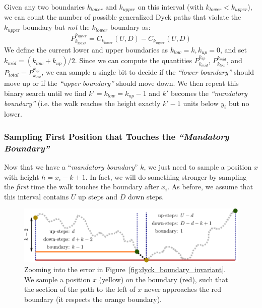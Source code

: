 Given any two boundaries $k_{lower}$ and $k_{upper}$ on this interval (with $k_{lower} < k_{upper}$),
we can count the number of possible generalized Dyck paths that violate the $k_{upper}$ boundary but \emph{not} the $k_{lower}$ boundary as:
\[
P_{k_{lower}}^{k_{upper}} = C_{k_{lower}}(U,D) - C_{k_{upper}}(U,D)
\]
We define the current lower and upper boundaries as $k_{low} = k, k_{up} = 0$, and set $k_{mid} = (k_{low} + k_{up})/2$.
Since we can compute the quantities $P_{k_{mid}}^{k_{up}}$, $P_{k_{low}}^{k_{mid}}$, and $P_{total} = P_{k_{low}}^{k_{up}}$,
we can sample a single bit to decide if the \emph{``lower boundary''} should move up or if the \emph{``upper boundary''} should move down.
We then repeat this binary search until we find $k' = k_{low} = k_{up}-1$ and $k'$ becomes the \emph{``mandatory boundary''}
(i.e. the walk reaches the height exactly $k'-1$ units below $y_i$ but no lower.



\subsubsection{Sampling First Position that Touches the \emph{``Mandatory Boundary''}}
\label{sec:sampling_first_position_touching_mandatory_boundary}

Now that we have a ``\emph{mandatory boundary}'' $k$, we just need to sample a position $x$ with height $h = x_i-k+1$.
In fact, we will do something stronger by sampling the \emph{first} time the walk touches the boundary after $x_i$.
As before, we assume that this interval contains $U$ up steps and $D$ down steps.
\begin{figure}[htpb]
    \centering
    \includegraphics[width=\textwidth]{images/dyck_first_approach_sampling.pdf}
    \caption{Zooming into the error in Figure~\ref{fig:dyck_boundary_invariant}.
        We sample a position $x$ (yellow) on the boundary (red),
        such that the section of the path to the left of $x$ never approaches the red boundary (it respects the orange boundary).}
    \label{fig:dyck_mandatory_boundary_sampling}
\end{figure}

